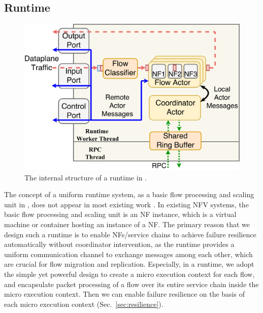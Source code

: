 
\subsection{Runtime}
\label{sec:runtime}

\begin{figure}
		\centering
		\includegraphics[width=\columnwidth]{figure/new-nfactor-runtime-arch.pdf}

		\caption{The internal structure of a runtime in \nfactor.}
\label{fig:runtime-arch}
\end{figure}

The concept of a uniform runtime system, as a basic flow processing and scaling unit in \nfactor, does not appear in most existing work \cite{bremler2015openbox, gember2012stratos, palkar2015e2}. In existing NFV systems, the basic flow processing and scaling unit is an NF instance, which is a virtual machine or container hosting an instance of a NF. %
 The primary reason that we design such a runtime is to enable NFs/service chains to achieve failure resilience automatically without coordinator intervention, as the runtime provides a uniform communication channel to %
 exchange messages among each other, which are crucial for flow migration and replication.
  Especially, in a runtime, we adopt the simple yet powerful design to create a micro execution context for each flow, and encapsulate %
  packet processing of a flow over its entire service chain inside the micro execution context. Then we can enable failure resilience on the basis of each micro execution context (Sec.~\ref{sec:resilience}). %

